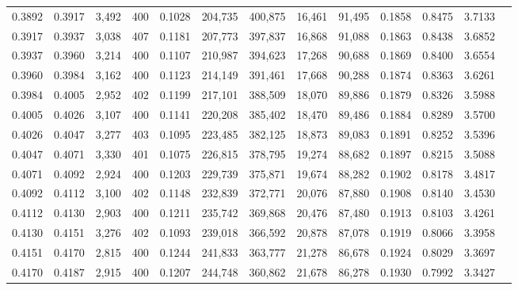 \begin{tabular}{rrrrrrrrrrrrr}
0.3892 & 0.3917 &  3,492 & 400 &                                     0.1028 & 204,735 & 400,875 &  16,461 &  91,495 & 0.1858 & 0.8475 & 3.7133 \\
0.3917 & 0.3937 &  3,038 & 407 &                                     0.1181 & 207,773 & 397,837 &  16,868 &  91,088 & 0.1863 & 0.8438 & 3.6852 \\
0.3937 & 0.3960 &  3,214 & 400 &                                     0.1107 & 210,987 & 394,623 &  17,268 &  90,688 & 0.1869 & 0.8400 & 3.6554 \\
0.3960 & 0.3984 &  3,162 & 400 &                                     0.1123 & 214,149 & 391,461 &  17,668 &  90,288 & 0.1874 & 0.8363 & 3.6261 \\
0.3984 & 0.4005 &  2,952 & 402 &                                     0.1199 & 217,101 & 388,509 &  18,070 &  89,886 & 0.1879 & 0.8326 & 3.5988 \\
0.4005 & 0.4026 &  3,107 & 400 &                                     0.1141 & 220,208 & 385,402 &  18,470 &  89,486 & 0.1884 & 0.8289 & 3.5700 \\
0.4026 & 0.4047 &  3,277 & 403 &                                     0.1095 & 223,485 & 382,125 &  18,873 &  89,083 & 0.1891 & 0.8252 & 3.5396 \\
0.4047 & 0.4071 &  3,330 & 401 &                                     0.1075 & 226,815 & 378,795 &  19,274 &  88,682 & 0.1897 & 0.8215 & 3.5088 \\
0.4071 & 0.4092 &  2,924 & 400 &                                     0.1203 & 229,739 & 375,871 &  19,674 &  88,282 & 0.1902 & 0.8178 & 3.4817 \\
0.4092 & 0.4112 &  3,100 & 402 &                                     0.1148 & 232,839 & 372,771 &  20,076 &  87,880 & 0.1908 & 0.8140 & 3.4530 \\
0.4112 & 0.4130 &  2,903 & 400 &                                     0.1211 & 235,742 & 369,868 &  20,476 &  87,480 & 0.1913 & 0.8103 & 3.4261 \\
0.4130 & 0.4151 &  3,276 & 402 &                                     0.1093 & 239,018 & 366,592 &  20,878 &  87,078 & 0.1919 & 0.8066 & 3.3958 \\
0.4151 & 0.4170 &  2,815 & 400 &                                     0.1244 & 241,833 & 363,777 &  21,278 &  86,678 & 0.1924 & 0.8029 & 3.3697 \\
0.4170 & 0.4187 &  2,915 & 400 &                                     0.1207 & 244,748 & 360,862 &  21,678 &  86,278 & 0.1930 & 0.7992 & 3.3427 \\

\end{tabular}
